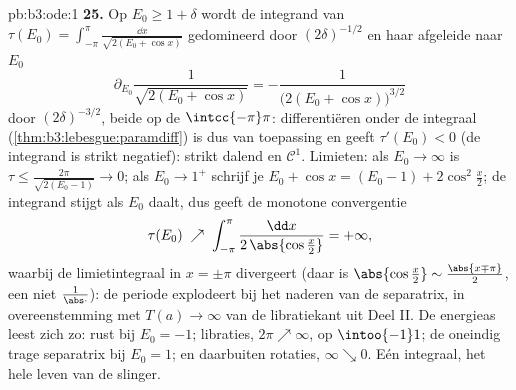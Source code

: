 \begin{solution}{pb:b3:ode:1}
\textbf{25.} Op $E_0 \geq 1 + \delta$ wordt de integrand van
$\tau(E_0) = \int_{-\pi}^{\pi}\frac{\dd x}{\sqrt{2(E_0 + \cos
x)}}$ gedomineerd door $(2\delta)^{-1/2}$ en haar afgeleide naar
$E_0$
\[
\partial_{E_0}\frac1{\sqrt{2(E_0 + \cos x)}}
= -\frac{1}{\bigl(2(E_0 + \cos x)\bigr)^{3/2}}
\]
door $(2\delta)^{-3/2}$, beide  op de 
$\intcc{-\pi}\pi$: differentiëren onder de integraal
(\cref{thm:b3:lebesgue:paramdiff}) is dus van toepassing en geeft
$\tau'(E_0) < 0$ (de integrand is strikt negatief): strikt
dalend en $\mathcal C^1$. Limieten: als $E_0 \to \infty$ is $\tau
\leq \frac{2\pi}{\sqrt{2(E_0 - 1)}} \to 0$; als $E_0 \to 1^+$
schrijf je $E_0 + \cos x = (E_0 - 1) + 2\cos^2\frac x2$; de
integrand stijgt als $E_0$ daalt, dus geeft de monotone
convergentie
\[
\tau(E_0) \;\nearrow\;
\int_{-\pi}^{\pi}\frac{\dd x}{2\,\abs{\cos\frac x2}}
= +\infty,
\]
waarbij de limietintegraal in $x = \pm\pi$ divergeert (daar is
$\abs{\cos\frac x2} \sim \frac{\abs{x \mp \pi}}2$, een niet
 $\frac1{\abs\cdot}$): de periode explodeert bij het
naderen van de separatrix, in overeenstemming met $T(a) \to
\infty$ van de libratiekant uit Deel II. De energieas leest zich
zo: rust bij $E_0 = -1$; libraties, $2\pi \nearrow \infty$, op
$\intoo{-1}1$; de oneindig trage separatrix bij $E_0 = 1$; en
daarbuiten rotaties, $\infty \searrow 0$. Eén integraal, het hele
leven van de slinger.
\end{solution}
